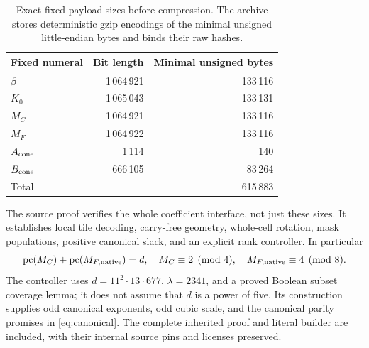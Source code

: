 \begin{table}[ht]\centering
\begin{tabular}{lrr}\toprule
Fixed numeral & Bit length & Minimal unsigned bytes\\\midrule
\(\beta\)&1\,064\,921&133\,116\\
\(K_0\)&1\,065\,043&133\,131\\
\(M_C\)&1\,064\,921&133\,116\\
\(M_F\)&1\,064\,922&133\,116\\
\(A_{\rm cone}\)&1\,114&140\\
\(B_{\rm cone}\)&666\,105&83\,264\\\midrule
Total&&615\,883\\\bottomrule
\end{tabular}
\caption{Exact fixed payload sizes before compression.
The archive stores deterministic gzip encodings of the minimal
unsigned little-endian bytes and binds their raw hashes.}
\end{table}

The source proof verifies the whole coefficient interface, not just
these sizes. It establishes local tile decoding, carry-free geometry,
whole-cell rotation, mask populations, positive canonical slack, and
an explicit rank controller. In particular
\[
\operatorname{pc}(M_C)+\operatorname{pc}(M_{F,\rm native})=d,\quad
M_C\equiv2\pmod4,\quad M_{F,\rm native}\equiv4\pmod8.
\]
The controller uses
\(d=11^2\cdot13\cdot677\), \(\lambda=2341\), and a proved Boolean
subset coverage lemma; it does not assume that \(d\) is a power of
five. Its construction supplies odd canonical exponents, odd cubic
scale, and the canonical parity promises in \eqref{eq:canonical}.
The complete inherited proof and literal builder are included,
with their internal source pins and licenses preserved.

